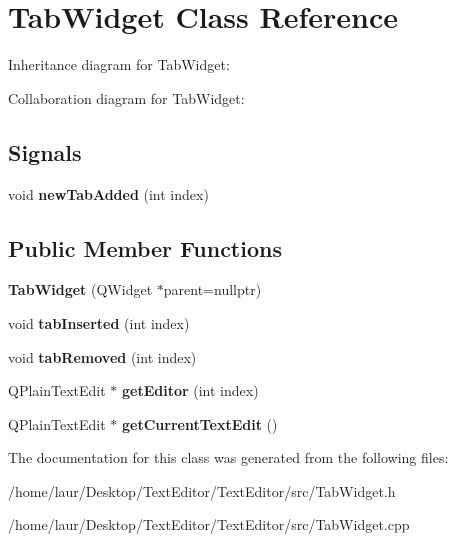 \hypertarget{class_tab_widget}{}\section{Tab\+Widget Class Reference}
\label{class_tab_widget}


Inheritance diagram for Tab\+Widget\+:


Collaboration diagram for Tab\+Widget\+:
\subsection*{Signals}
\begin{DoxyCompactItemize}
\item 
\mbox{\label{class_tab_widget_a250ae4cb25decc904a9c3bfa5e851da9}} 
void {\bfseries new\+Tab\+Added} (int index)
\end{DoxyCompactItemize}
\subsection*{Public Member Functions}
\begin{DoxyCompactItemize}
\item 
\mbox{\label{class_tab_widget_af5768315004b08e0811a82df7470b9d2}} 
{\bfseries Tab\+Widget} (Q\+Widget $\ast$parent=nullptr)
\item 
\mbox{\label{class_tab_widget_aaa2a8ea42df1d8cd610774f5949a7327}} 
void {\bfseries tab\+Inserted} (int index)
\item 
\mbox{\label{class_tab_widget_ab69cb80007b5e786916f58b70f12bfd7}} 
void {\bfseries tab\+Removed} (int index)
\item 
\mbox{\label{class_tab_widget_a689ee0415a09e9542b55277a42a4f73a}} 
Q\+Plain\+Text\+Edit $\ast$ {\bfseries get\+Editor} (int index)
\item 
\mbox{\label{class_tab_widget_ae93e36a14fb482a93c24ed507a5be314}} 
Q\+Plain\+Text\+Edit $\ast$ {\bfseries get\+Current\+Text\+Edit} ()
\end{DoxyCompactItemize}


The documentation for this class was generated from the following files\+:\begin{DoxyCompactItemize}
\item 
/home/laur/\+Desktop/\+Text\+Editor/\+Text\+Editor/src/Tab\+Widget.\+h\item 
/home/laur/\+Desktop/\+Text\+Editor/\+Text\+Editor/src/Tab\+Widget.\+cpp\end{DoxyCompactItemize}
